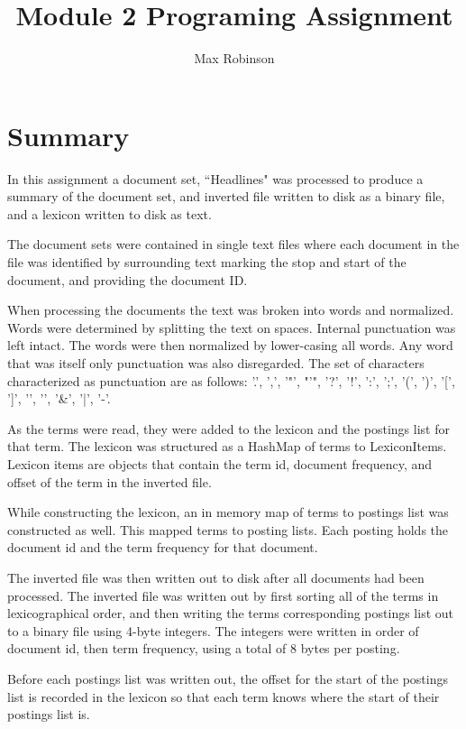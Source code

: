 \documentclass{article}
\begin{document}
\title{Module 2 Programing Assignment}
\author{Max Robinson}
\date{}
\maketitle

\section{Summary}
In this assignment a document set, ``Headlines" was processed to produce a summary of the document set, and inverted file written to disk as a binary file, and a lexicon written to disk as text. 

The document sets were contained in single text files where each document in the file was identified by surrounding text marking the stop and start of the document, and providing the document ID. 

When processing the documents the text was broken into words and normalized. Words were determined by splitting the text on spaces. Internal punctuation was left intact. The words were then normalized by lower-casing all words. Any word that was itself only punctuation was also disregarded. The set of characters characterized as punctuation are as follows: '.',  ',', '"', "'", '?', '!', ':', ';', '(', ')', '[', ']', '{', '}', '\&', '|', '-'.

As the terms were read, they were added to the lexicon and the postings list for that term. The lexicon was structured as a HashMap of terms to LexiconItems. Lexicon items are objects that contain the term id, document frequency, and offset of the term in the inverted file. 

While constructing the lexicon, an in memory map of terms to postings list was constructed as well. This mapped terms to posting lists. Each posting holds the document id and the term frequency for that document. 

The inverted file was then written out to disk after all documents had been processed. The inverted file was written out by first sorting all of the terms in lexicographical order, and then writing the terms corresponding postings list out to a binary file using 4-byte integers. The integers were written in order of document id, then term frequency, using a total of 8 bytes per posting. 

Before each postings list was written out, the offset for the start of the postings list is recorded in the lexicon so that each term knows where the start of their postings list is. 
\end{document}
